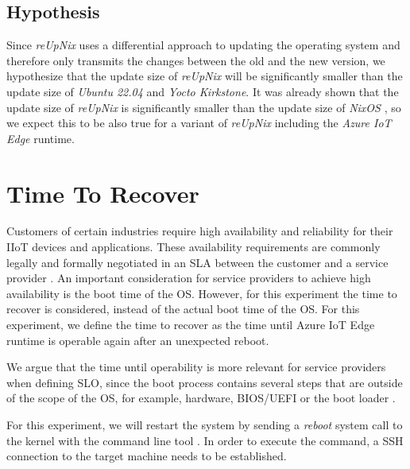\subsection{Hypothesis}

Since \textit{reUpNix} uses a differential approach to updating the operating
system and therefore only transmits the changes between the old and the new
version, we hypothesize that the update size of \textit{reUpNix} will be
significantly smaller than the update size of \textit{Ubuntu 22.04} and
\textit{Yocto Kirkstone}. It was already shown that the update size of
\textit{reUpNix} is significantly smaller than the update size of \textit{NixOS}
\cite{gollenstede:23:lctes}, so we expect this to be also true for a variant
of \textit{reUpNix} including the \textit{Azure IoT Edge} runtime.

\section{Time To Recover}
Customers of certain industries require high availability and reliability for
their \ac{IIoT} devices and applications. These availability requirements
are commonly legally and formally negotiated in an \ac{SLA} between
the customer and a service provider \cite{msdoc-slas}. An important consideration
for service providers to achieve high availability is the boot time of the
\ac{OS}. However, for this experiment the time to recover is considered,
instead of the actual boot time of the \ac{OS}. For this experiment, we define the
time to recover as the time until Azure IoT Edge runtime is operable again after
an unexpected reboot.

We argue that the time until operability is more relevant for service providers
when defining \ac{SLO}, since the boot process contains several steps that are
outside of the scope of the \ac{OS}, for example, hardware, BIOS/UEFI or the boot
loader \cite{almesberg}.

For this experiment, we will restart the system by sending a \textit{reboot} system
call to the kernel with the  command line tool \cite{man-reboot}.
In order to execute the command, a \ac{SSH} connection to the target machine
needs to be established.

\clearpage

